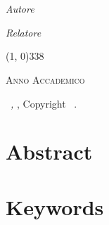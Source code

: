 \documentclass[12pt,a4paper,twoside,openright,english]{book}
\begin{document}
\begin{titlepage}
\begin{center}
		\LARGE{\textsc{\textbf{\myTitle}}}\\
		\large{\mySubTitle}\\
		\vfill
		\begin{minipage}{0.4\textwidth}
			\begin{flushleft} \large
				\emph{Autore}\\
				\myName
			\end{flushleft}
		\end{minipage}
		\hfill
		\begin{minipage}{0.4\textwidth}
			\begin{flushright} \large
				\emph{Relatore} \\
				\myProf
			\end{flushright}
		\end{minipage}
		\vfill
		\line(1, 0){338} \\
		\begin{normalsize}
			\textsc{Anno Accademico \myAA}
		\end{normalsize}
	\end{center}
\end{titlepage}

\thispagestyle{empty}
\hfill
\vfill
\noindent \myName\ \textit{\myTitle,} \myDegree, Copyright \textcopyright\ \myTime.

\cleardoublepage

\chapter*{Abstract}\label{abstract}

\chapter*{Keywords}\label{keywords}
\end{document}
